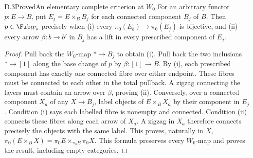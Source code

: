\begin{claim}{D.3}{Proved}{An elementary complete criterion at $W_0$}
For an arbitrary functor $p:E\to B$, put $E_j=E\times_BB_j$ for each connected component $B_j$ of $B$. Then $p\in\Fib_{W_0}$ precisely when (i) every $\pi_0(E_b)\to\pi_0(E_j)$ is bijective, and (ii) every arrow $\beta:b\to b'$ in $B_j$ has a lift in every prescribed component of $E_j$.
\end{claim}
\begin{proof}
Pull back the $W_0$-map $*\to B_j$ to obtain (i). Pull back the two inclusions $*\to[1]$ along the base change of $p$ by $\beta:[1]\to B$. By (i), each prescribed component has exactly one connected fibre over either endpoint. These fibres must be connected to each other in the total pullback. A zigzag connecting the layers must contain an arrow over $\beta$, proving (ii). Conversely, over a connected component $X_a$ of any $X\to B_j$, label objects of $E\times_BX_a$ by their component in $E_j$. Condition (i) says each labelled fibre is nonempty and connected. Condition (ii) connects these fibres along each arrow of $X_a$. A zigzag in $X_a$ therefore connects precisely the objects with the same label. This proves, naturally in $X$,
$\pi_0(E\times_BX)=\pi_0E\times_{\pi_0B}\pi_0X$.
This formula preserves every $W_0$-map and proves the result, including empty categories.
\end{proof}


